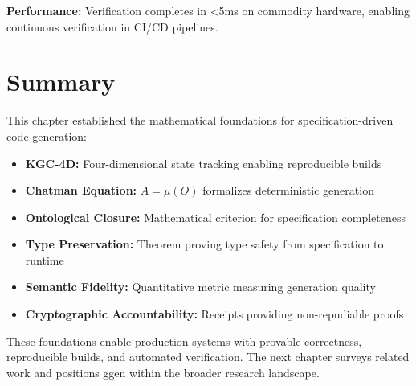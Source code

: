 \textbf{Performance:} Verification completes in <5ms on commodity hardware, enabling continuous verification in CI/CD pipelines.

\section{Summary}

This chapter established the mathematical foundations for specification-driven code generation:

\begin{itemize}
    \item \textbf{KGC-4D:} Four-dimensional state tracking enabling reproducible builds
    \item \textbf{Chatman Equation:} \(A = \mu(O)\) formalizes deterministic generation
    \item \textbf{Ontological Closure:} Mathematical criterion for specification completeness
    \item \textbf{Type Preservation:} Theorem proving type safety from specification to runtime
    \item \textbf{Semantic Fidelity:} Quantitative metric measuring generation quality
    \item \textbf{Cryptographic Accountability:} Receipts providing non-repudiable proofs
\end{itemize}

These foundations enable production systems with provable correctness, reproducible builds, and automated verification. The next chapter surveys related work and positions ggen within the broader research landscape.
